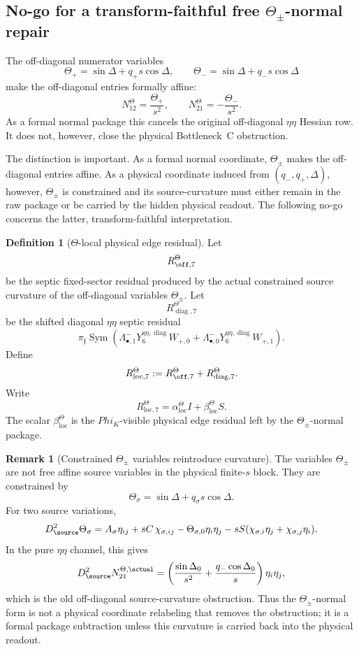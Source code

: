 \documentclass[11pt,a4paper]{amsart}
\def\Phi{Phi}%
\theoremstyle{plain}
\theoremstyle{definition}
\newtheorem{definition}[theorem]{Definition}
\newtheorem{remark}[theorem]{Remark}
\newcommand{\loc}{\mathrm{loc}}
\newcommand{\diag}{\operatorname{diag}}
\begin{document}
\subsection{No-go for a transform-faithful free \(\Theta_\pm\)-normal repair}
\label{subsec:no-go-theta-normal-repair}

The off-diagonal numerator variables
\[
\Theta_+=\sin\Delta+q_+s\cos\Delta,
\qquad
\Theta_-=\sin\Delta+q_-s\cos\Delta
\]
make the off-diagonal entries formally affine:
\[
N_{12}^{\Theta}=\frac{\Theta_+}{s^2},
\qquad
N_{21}^{\Theta}=-\frac{\Theta_-}{s^2}.
\]
As a formal normal package this cancels the original off-diagonal
\(\eta\eta\) Hessian row.  It does not, however, close the physical
Bottleneck~C obstruction.

The distinction is important.  As a formal normal coordinate, \(\Theta_\pm\)
makes the off-diagonal entries affine.  As a physical coordinate induced from
\((q_-,q_+,\Delta)\), however, \(\Theta_\pm\) is constrained and its
source-curvature must either remain in the raw package or be carried by the
hidden physical readout.  The following no-go concerns the latter,
transform-faithful interpretation.

\begin{definition}[\(\Theta\)-local physical edge residual]
\label{def:theta-local-physical-edge-residual}
Let
\[
R_{\off,7}^{\Theta}
\]
be the septic fixed-sector residual produced by the actual constrained source
curvature of the off-diagonal variables \(\Theta_\pm\).  Let
\[
R_{\diag,7}^{\Theta}
\]
be the shifted diagonal \(\eta\eta\) septic residual
\[
\pi_{\mathfrak f}
\operatorname{Sym}
\left(
\Lambda^-_{\bullet,1}Y^{\eta\eta,\diag}_6W_{+,0}
+
\Lambda^-_{\bullet,0}Y^{\eta\eta,\diag}_6W_{+,1}
\right).
\]
Define
\[
R_{\loc,7}^{\Theta}
:=
R_{\off,7}^{\Theta}+R_{\diag,7}^{\Theta}.
\]
Write
\[
R_{\loc,7}^{\Theta}
=
\alpha_{\loc}^{\Theta}I+\beta_{\loc}^{\Theta}S.
\]
The scalar \(\beta_{\loc}^{\Theta}\) is the \(\Phi_K\)-visible physical edge
residual left by the \(\Theta_\pm\)-normal package.
\end{definition}

\begin{remark}[Constrained \(\Theta_\pm\) variables reintroduce curvature]
\label{rem:constrained-theta-reintroduces-curvature}
The variables \(\Theta_\pm\) are not free affine source variables in the
physical finite-\(s\) block.  They are constrained by
\[
\Theta_\sigma=\sin\Delta+q_\sigma s\cos\Delta.
\]
For two source variations,
\[
D_{\source}^2\Theta_\sigma
=
A_\sigma\eta_{ij}
+sC\,\chi_{\sigma,ij}
-\Theta_{\sigma,0}\eta_i\eta_j
-sS(\chi_{\sigma,i}\eta_j+\chi_{\sigma,j}\eta_i).
\]
In the pure \(\eta\eta\) channel, this gives
\[
D_{\source}^2N_{21}^{\Theta,\actual}
=
\left(
\frac{\sin\Delta_0}{s^2}
+
\frac{q_-\cos\Delta_0}{s}
\right)\eta_i\eta_j,
\]
which is the old off-diagonal source-curvature obstruction.  Thus the
\(\Theta_\pm\)-normal form is not a physical coordinate relabeling that
removes the obstruction; it is a formal package subtraction unless this
curvature is carried back into the physical readout.
\end{remark}
\end{document}
